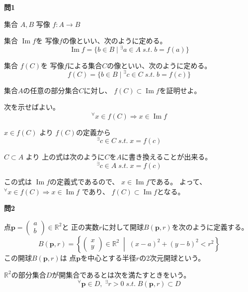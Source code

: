 \documentclass[12pt,b5paper]{ltjsarticle}
\newcommand{\Img}{\mathop{\mathrm{Im}}\nolimits}
\begin{document}
\textbf{問1}

集合 $A, B$
\quad
写像 $f: A \rightarrow B$

集合 $\Img f$を 写像$f$の像といい、次のように定める。
\begin{equation}
 \Img f = \{ b \in B \mid {}^\exists a\in A \; s.t. \; b=f(a)\}
\end{equation}

集合 $f(C)$を 写像$f$による集合$C$の像といい、次のように定める。
\begin{equation}
 f(C) = \{ b \in B \mid {}^\exists c\in C \; s.t. \; b=f(c)\}
\end{equation}

集合$A$の任意の部分集合$C$に対し、
$f(C)\subset \Img f$を証明せよ。

\dotfill

次を示せばよい。
\begin{equation}
 {}^\forall x\in f(C) \Rightarrow x \in \Img f
\end{equation}

$x\in f(C)$ より
$f(C)$の定義から
\begin{equation}
 {}^\exists c\in C \; s.t. \; x=f(c)
\end{equation}

$C\subset A$ より 上の式は次のように$C$を$A$に書き換えることが出来る。
\begin{equation}
 {}^\exists c\in A \; s.t. \; x=f(c)
\end{equation}

この式は $\Img f$の定義式であるので、
$x\in \Img f$である。
よって、
${}^\forall x\in f(C) \Rightarrow x \in \Img f$ であり、
$f(C)\subset \Img f$となる。


\hrulefill


\textbf{問2}

点$\bm{p}=\begin{pmatrix}a\\b\end{pmatrix} \in \mathbb{R}^2$と
正の実数$r$に対して開球$B(\bm{p},r)$を次のように定義する。
\begin{equation}
 B(\bm{p},r) = \left\{ \begin{pmatrix}x\\y\end{pmatrix} \in \mathbb{R}^2 \;
               \middle| \; (x-a)^2 + (y-b)^2 < r^2 \right\}
\end{equation}
この開球$B(\bm{p},r)$は 点$\bm{p}$を中心とする半径$r$の2次元開球という。

$\mathbb{R}^2$の部分集合$D$が開集合であるとは次を満たすときをいう。
\begin{equation}
 {}^\forall \bm{p}\in D, \; {}^\exists r>0
  \; s.t. \; B(\bm{p},r) \subset D
\end{equation}
\end{document}
